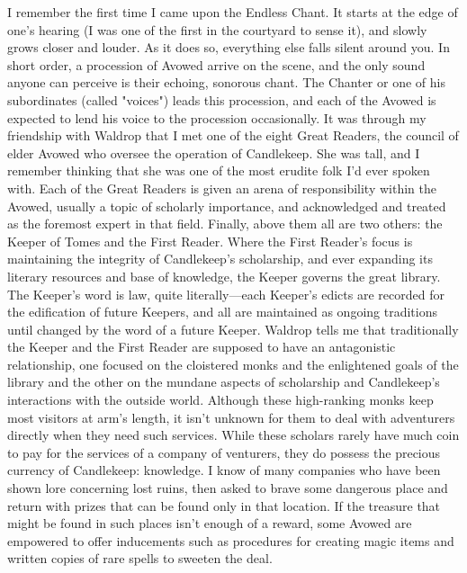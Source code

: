 \documentclass[10pt,a4paper,twoside,twocolumn,openany,bg=print,nodeprecatedcode]{dndbook}
\begin{document}
I remember the first time I came upon the Endless Chant. It starts at the edge of one's hearing (I was one of the first in the courtyard to sense it), and slowly grows closer and louder. As it does so, everything else falls silent around you. In short order, a procession of Avowed arrive on the scene, and the only sound anyone can perceive is their echoing, sonorous chant. The Chanter or one of his subordinates (called "voices") leads this procession, and each of the Avowed is expected to lend his voice to the procession occasionally.
It was through my friendship with Waldrop that I met one of the eight Great Readers, the council of elder Avowed who oversee the operation of Candlekeep. She was tall, and I remember thinking that she was one of the most erudite folk I'd ever spoken with. Each of the Great Readers is given an arena of responsibility within the Avowed, usually a topic of scholarly importance, and acknowledged and treated as the foremost expert in that field.
Finally, above them all are two others: the Keeper of Tomes and the First Reader. Where the First Reader's focus is maintaining the integrity of Candlekeep's scholarship, and ever expanding its literary resources and base of knowledge, the Keeper governs the great library. The Keeper's word is law, quite literally—each Keeper's edicts are recorded for the edification of future Keepers, and all are maintained as ongoing traditions until changed by the word of a future Keeper. Waldrop tells me that traditionally the Keeper and the First Reader are supposed to have an antagonistic relationship, one focused on the cloistered monks and the enlightened goals of the library and the other on the mundane aspects of scholarship and Candlekeep's interactions with the outside world.
Although these high-ranking monks keep most visitors at arm's length, it isn't unknown for them to deal with adventurers directly when they need such services. While these scholars rarely have much coin to pay for the services of a company of venturers, they do possess the precious currency of Candlekeep: knowledge. I know of many companies who have been shown lore concerning lost ruins, then asked to brave some dangerous place and return with prizes that can be found only in that location. If the treasure that might be found in such places isn't enough of a reward, some Avowed are empowered to offer inducements such as procedures for creating magic items and written copies of rare spells to sweeten the deal.
\end{document}
